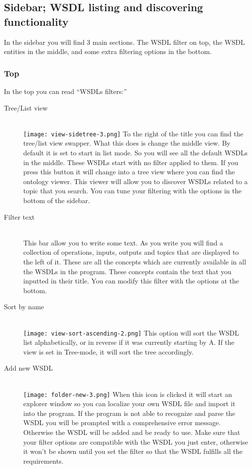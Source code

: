 \documentclass[a4paper,10pt]{article}
\begin{document}
  \subsection{Sidebar; WSDL listing and discovering functionality}

    In the sidebar you will find 3 main sections. The WSDL filter on top, the WSDL entities in the middle, and some extra filtering options in the bottom.

    \subsubsection{Top}

    In the top you can read  “WSDLs filters:”

    \begin{description}
      \item[Tree/List view] \hfill \\
      \texttt{[image: view-sidetree-3.png]} To the right of the title you can find the tree/list view swapper. What this does is change the middle view. By default it is set to start in list mode. So you will see all the default WSDLs in the middle. These WSDLs start with no filter applied to them. If you press this button it will change into a tree view where you can find the ontology viewer. This viewer will allow you to discover WSDLs related to a topic that you search. You can tune your filtering with the options in the bottom of the sidebar.
      \item[Filter text] \hfill \\
      This bar allow you to write some text. As you write you will find a collection of operations, inputs, outputs and topics that are displayed to the left of it. These are all the concepts which are currently available in all the WSDLs in the program. These concepts contain the text that you inputted in their title. You can modify this filter with the options at the bottom.
      \item[Sort by name] \hfill \\
      \texttt{[image: view-sort-ascending-2.png]} This option will sort the WSDL list alphabetically, or in reverse if it was currently starting by A. If the view is set in Tree-mode, it will sort the tree accordingly.
      \item[Add new WSDL] \hfill \\
      \texttt{[image: folder-new-3.png]} When this icon is clicked it will start an explorer window so you can localize your own WSDL file and import it into the program. If the program is not able to recognize and parse the WSDL you will be prompted with a comprehensive error message. Otherwise the WSDL will be added and be ready to use. Make sure that your filter options are compatible with the WSDL you just enter, otherwise it won't be shown until you set the filter so that the WSDL fulfills all the requirements.
    \end{description}
\end{document}
